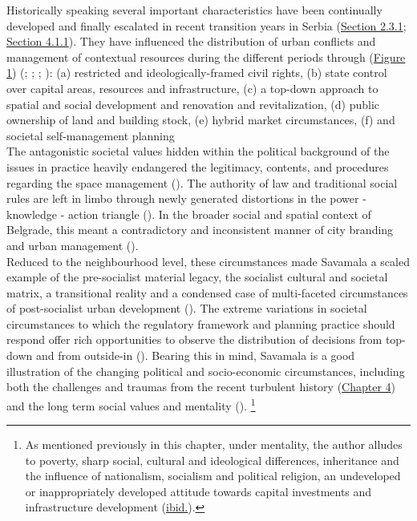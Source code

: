 \documentclass[11pt]{report}
\begin{document}
Historically speaking several important characteristics have been continually developed and finally escalated in recent transition years in Serbia (\href{Section 2.3.1}{Section 2.3.1}; \href{Section 4.1.1}{Section 4.1.1}). They have influenced the distribution of urban conflicts and management of contextual resources during the different periods through (\href{Figure 1}{Figure 1}) (\href{ref}{\citealt{simmie_self-management_1989}}; \href{ref}{\citealt{vujovic_belgrades_2007}}; \href{ref}{\citealt{petrovic_cities_2009}}; \href{ref}{\citealt{vujosevic_postsocijalisticka_2010}}): 
(a) restricted and ideologically-framed civil rights, 
(b) state control over capital areas, resources and infrastructure,
(c) a top-down approach to spatial and social development and renovation and revitalization,
(d) public ownership of land and building stock,
(e) hybrid market circumstances,
(f) and societal self-management planning
\\

The antagonistic societal values hidden within the political background of the issues in practice heavily endangered the legitimacy, contents, and procedures regarding the space management (\href{ref}{\citealt{vujosevic_planning_2006}}).
The authority of law and traditional social rules are left in limbo through newly generated distortions in the power - knowledge - action triangle (\href{ref}{\citealt{friedmann_planning_1987}}).
In the broader social and spatial context of Belgrade, this meant a contradictory and inconsistent manner of city branding and urban management
(\href{ref}{\citealt{doytchinov_belgrade:_2015}}).
\\

Reduced to the neighbourhood level, these circumstances made Savamala a scaled example of the pre-socialist material legacy, the socialist cultural and societal matrix, a transitional reality and a condensed case of multi-faceted circumstances of post-socialist urban development (\href{ref}{\citealt{cvetinovic_reading_2016}}).
The extreme variations in societal circumstances to which the regulatory framework and planning practice should respond offer rich opportunities to observe the distribution of decisions from top-down and from outside-in (\href{Peric}{\citealt{peric_evolution_2016}}).
Bearing this in mind, Savamala is a good illustration of the changing political and socio-economic circumstances, including both the challenges and traumas from the recent turbulent history (\href{Chapter 4}{Chapter 4}) and the long term social values and mentality (\href{ref}{\citealt{doytchinov_belgrade_2015}}).
\footnote{As mentioned previously in this chapter, under mentality, the author alludes to poverty, sharp social, cultural and ideological differences, inheritance and the influence of nationalism, socialism and political religion, an undeveloped or inappropriately developed attitude towards capital investments and infrastructure development  (\href{Samardzic}{ibid.}).}
\\
\end{document}
